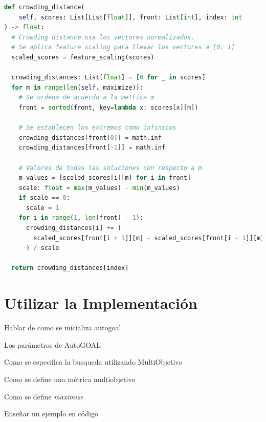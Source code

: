 \begin{lstlisting}[language=Python]
def crowding_distance(
    self, scores: List[List[float]], front: List[int], index: int
) -> float:
  # Crowding distance usa los vectores normalizados.
  # Se aplica feature scaling para llevar los vectores a [0, 1]
  scaled_scores = feature_scaling(scores)

  crowding_distances: List[float] = [0 for _ in scores]
  for m in range(len(self._maximize)):
    # Se ordena de acuerdo a la metrica m
    front = sorted(front, key=lambda x: scores[x][m])

    # Se establecen los extremos como infinitos
    crowding_distances[front[0]] = math.inf
    crowding_distances[front[-1]] = math.inf

    # Valores de todas las soluciones con respecto a m 
    m_values = [scaled_scores[i][m] for i in front]
    scale: float = max(m_values) - min(m_values)
    if scale == 0:
      scale = 1
    for i in range(1, len(front) - 1):
      crowding_distances[i] += (
        scaled_scores[front[i + 1]][m] - scaled_scores[front[i - 1]][m]
      ) / scale

  return crowding_distances[index]
\end{lstlisting}

\section{Utilizar la Implementaci\'on}

Hablar de como se inicializa autogoal

Los par\'ametros de AutoGOAL

Como se especifica la busqueda utilizando MultiObjetivo

Como se define una m\'etrica multiobjetivo

Como se define \textit{maximize}

Ense\~nar un ejemplo en c\'odigo 
